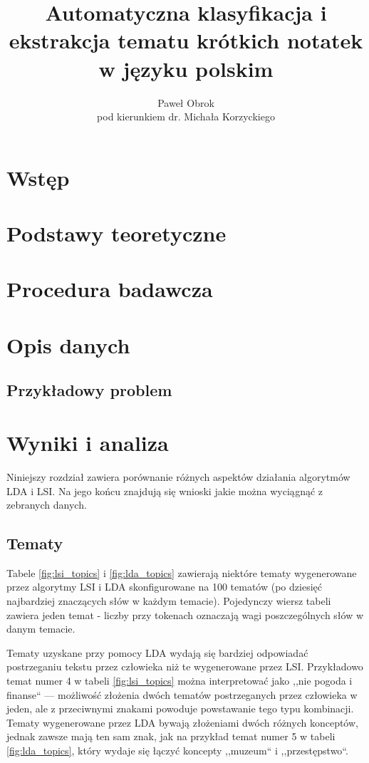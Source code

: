 \documentclass[11pt,a4paper]{article}
\begin{document}
\title{Automatyczna klasyfikacja i ekstrakcja tematu krótkich notatek w języku polskim}
\author{Paweł Obrok\\pod kierunkiem dr. Michała Korzyckiego}

\maketitle
\pagebreak

\tableofcontents
\pagebreak

\section{Wstęp}
\section{Podstawy teoretyczne}
\section{Procedura badawcza}
\section{Opis danych}
\subsection{Przykładowy problem}
\label{sec:example}
\section{Wyniki i analiza}

Niniejszy rozdział zawiera porównanie różnych aspektów działania algorytmów LDA
i LSI. Na jego końcu znajdują się wnioski jakie można wyciągnąć z zebranych
danych.

\subsection{Tematy}

Tabele \ref{fig:lsi_topics} i \ref{fig:lda_topics} zawierają niektóre tematy
wygenerowane przez algorytmy LSI i LDA skonfigurowane na 100 tematów (po
dziesięć najbardziej znaczących słów w każdym temacie). Pojedynczy wiersz
tabeli zawiera jeden temat - liczby przy tokenach oznaczają wagi poszczególnych
słów w danym temacie.

Tematy uzyskane przy pomocy LDA wydają się bardziej odpowiadać postrzeganiu
tekstu przez człowieka niż te wygenerowane przez LSI.  Przykładowo temat numer 4 w tabeli
\ref{fig:lsi_topics} można interpretować jako ,,nie pogoda i finanse`` ---
możliwość złożenia dwóch tematów postrzeganych przez człowieka w jeden, ale z
przeciwnymi znakami powoduje powstawanie tego typu kombinacji. Tematy wygenerowane
przez LDA bywają złożeniami dwóch różnych konceptów, jednak zawsze mają ten sam znak,
jak na przykład temat numer 5 w tabeli \ref{fig:lda_topics}, który wydaje się łączyć
koncepty ,,muzeum`` i ,,przestępstwo``.
\end{document}
